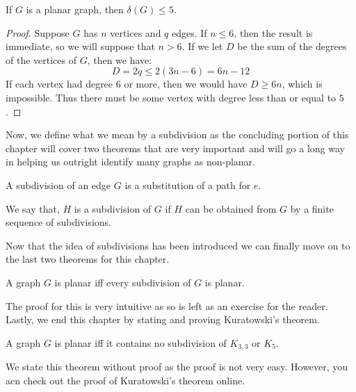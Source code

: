 \documentclass[../basic_graph_theory.tex]{subfiles}
\begin{document}
\begin{Thm}{}{}
    If $G$ is a planar graph, then $\delta(G) \le 5$.
\end{Thm}
\begin{proof}
    Suppose $G$ has $n$ vertices and $q$ edges. If $n \le 6$, then the result is immediate, so we will suppose that $n > 6$. If we let $D$ be the sum of the degrees of the vertices of $G$, then we have:\\
    \begin{equation*}
        D = 2q \le 2(3n - 6) = 6n - 12
    \end{equation*}
    If each vertex had degree $6$ or more, then we would have $D \ge 6n$, which is impossible. Thus there must be some vertex with degree less than or equal to $5$.
\end{proof}

Now, we define what we mean by a subdivision as the concluding portion of this chapter will cover two theorems that are very important and will go a long way in helping us outright identify many graphs as non-planar.\\

\begin{Def}{}{}
    A subdivision of an edge $G$ is a substitution of a path for $e$.
\end{Def}
\begin{Def}{}{}
    We say that, $H$ is a subdivision of $G$ if $H$ can be obtained from $G$ by a finite sequence of subdivisions.
\end{Def}

Now that the idea of subdivisions has been introduced we can finally move on to the last two theorems for this chapter.
\begin{Thm}{}{}
    A graph $G$ is planar iff every subdivision of $G$ is planar.
\end{Thm}
The proof for this is very intuitive as so is left as an exercise for the reader.\\
Lastly, we end this chapter by stating and proving Kuratowski's theorem.\\
\begin{Thm}{}{}
    A graph $G$ is planar iff it contains no subdivision of $K_{3,3}$ or $K_{5}$.
\end{Thm}
We state this theorem without proof as the proof is not very easy. However, you acn check out the proof of Kuratowski's theorem online.
\end{document}
